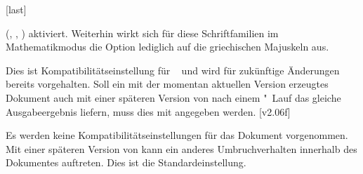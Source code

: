 \begin{Declaration*}{}
\begin{Declaration*}{}
\begin{Declaration*}{}
\begin{Declaration}[v2.03]{}[last]
\begin{values}{}
  (, , )
  aktiviert. Weiterhin wirkt sich für diese Schriftfamilien im Mathematikmodus 
  die Option  lediglich auf die griechischen 
  Majuskeln aus.
\item[2.06]
  Dies ist Kompatibilitätseinstellung für \TUDScript~\vTUDScript{} und wird für 
  zukünftige Änderungen bereits vorgehalten. Soll ein mit der momentan 
  aktuellen Version erzeugtes Dokument auch mit einer späteren Version von 
  \TUDScript nach einem "~Lauf das gleiche Ausgabeergebnis 
  liefern, muss dies mit  angegeben werden.
[v2.06f]
\item[last]
  Es werden keine Kompatibilitätseinstellungen für das Dokument vorgenommen. 
  Mit einer späteren Version von \TUDScript kann ein anderes Umbruchverhalten 
  innerhalb des Dokumentes auftreten. Dies ist die Standardeinstellung.
\end{values}
\end{Declaration}
\end{Declaration*}
\end{Declaration*}
\end{Declaration*}

